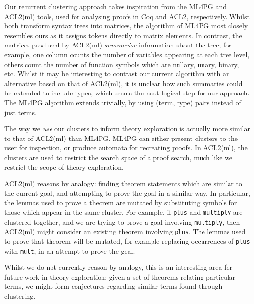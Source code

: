 Our recurrent clustering approach takes inspiration from the ML4PG
\cite{journals/corr/abs-1212-3618} and ACL2(ml) \cite{heras2013proof} tools,
used for analysing proofs in Coq and ACL2, respectively. Whilst both transform
syntax trees into matrices, the algorithm of ML4PG most closely resembles ours
as it assigns tokens directly to matrix elements. In contrast, the matrices
produced by ACL2(ml) \emph{summarise} information about the tree; for example,
one column counts the number of variables appearing at each tree level, others
count the number of function symbols which are nullary, unary, binary,
etc. Whilst it may be interesting to contrast our current algorithm with an
alternative based on that of ACL2(ml), it is unclear how such summaries could be
extended to include types, which seems the next logical step for our
approach. The ML4PG algorithm extends trivially, by using (term, type) pairs
instead of just terms.

The way we \emph{use} our clusters to inform theory exploration is actually more
similar to that of ACL2(ml) than ML4PG. ML4PG can either present clusters to the
user for inspection, or produce automata for recreating proofs. In ACL2(ml), the
clusters are used to restrict the search space of a proof search, much like we
restrict the scope of theory exploration.

ACL2(ml) reasons by analogy: finding theorem statements which are similar to the
current goal, and attempting to prove the goal in a similar way. In particular,
the lemmas used to prove a theorem are mutated by substituting symbols for those
which appear in the same cluster. For example, if \texttt{plus} and
\texttt{multiply} are clustered together, and we are trying to prove a goal
involving \texttt{multiply}, then ACL2(ml) might consider an existing theorem
involving \texttt{plus}. The lemmas used to prove that theorem will be mutated,
for example replacing occurrences of \texttt{plus} with \texttt{mult}, in an
attempt to prove the goal.

Whilst we do not currently reason by analogy, this is an interesting area for
future work in theory exploration: given a set of theorems relating particular
terms, we might form conjectures regarding similar terms found through
clustering.

\iffalse
We could expand this a bit, e.g. talking about how we both use Weka, etc.
\fi
